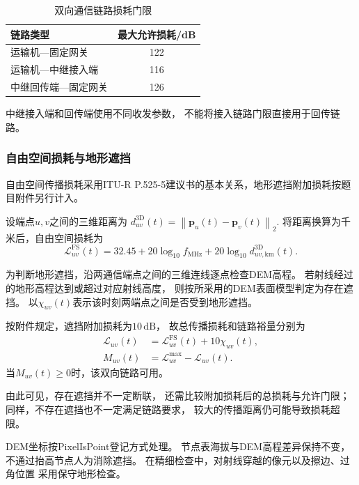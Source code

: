\documentclass[bwprint]{gmcmthesis}
\begin{document}
\begin{table}[htbp]
    \centering
    \caption{双向通信链路损耗门限}
    \label{tab:q3_link_budget}
    \begin{tabular}{lc}
        \toprule
        链路类型 & 最大允许损耗/dB \\
        \midrule
        运输机—固定网关 & 122 \\
        运输机—中继接入端 & 116 \\
        中继回传端—固定网关 & 126 \\
        \bottomrule
    \end{tabular}
\end{table}

中继接入端和回传端使用不同收发参数，
不能将接入链路门限直接用于回传链路。

\subsubsection{自由空间损耗与地形遮挡}
自由空间传播损耗采用ITU-R P.525-5建议书的基本关系\cite{itu2024}，地形遮挡附加损耗按题目附件另行计入。


设端点$u,v$之间的三维距离为
\(d_{uv}^{\mathrm{3D}}(t) = \left\| \boldsymbol{p}_u(t)-\boldsymbol{p}_v(t) \right\|_2\).
将距离换算为千米后，自由空间损耗为
\begin{equation}
    \mathcal{L}_{uv}^{\mathrm{FS}}(t)
    =
    32.45
    +20\log_{10}f_{\mathrm{MHz}}
    +20\log_{10}d_{uv,\mathrm{km}}^{\mathrm{3D}}(t).
    \label{eq:q3_fspl}
\end{equation}

为判断地形遮挡，沿两通信端点之间的三维连线逐点检查DEM高程。
若射线经过的地形高程达到或超过对应射线高度，
则按所采用的DEM表面模型判定为存在遮挡。
以$\chi_{uv}(t)$表示该时刻两端点之间是否受到地形遮挡。

按附件规定，遮挡附加损耗为$10\,\mathrm{dB}$，
故总传播损耗和链路裕量分别为
\begin{align}
    \mathcal{L}_{uv}(t)
    &=
    \mathcal{L}_{uv}^{\mathrm{FS}}(t)
    +10\chi_{uv}(t),\\
    M_{uv}(t)
    &=
    \mathcal{L}_{uv}^{\max}
    -\mathcal{L}_{uv}(t).
\end{align}
当$M_{uv}(t)\geq0$时，该双向链路可用。

由此可见，存在遮挡并不一定断联，
还需比较附加损耗后的总损耗与允许门限；
同样，不存在遮挡也不一定满足链路要求，
较大的传播距离仍可能导致损耗超限。

DEM坐标按PixelIsPoint登记方式处理。
节点表海拔与DEM高程差异保持不变，
不通过抬高节点人为消除遮挡。
在精细检查中，对射线穿越的像元以及擦边、过角位置
采用保守地形检查。
\end{document}
